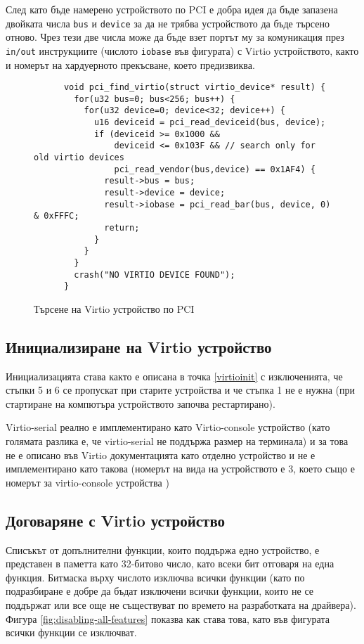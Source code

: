   След като бъде намерено устройството по PCI е добра идея да бъде запазена двойката числа {\tt bus} и {\tt device} за да не трябва устройството да бъде търсено отново. Чрез тези две числа може да бъде взет портът му за комуникация през {\tt in/out} инструкциите (числото {\tt iobase} във фигурата) с Virtio устройството, както и номерът на хардуерното прекъсване, което предизвиква.

  \begin{figure}[htpb]
    \centering
    \begin{verbatim}
      void pci_find_virtio(struct virtio_device* result) {
        for(u32 bus=0; bus<256; bus++) {
          for(u32 device=0; device<32; device++) {
            u16 deviceid = pci_read_deviceid(bus, device);
            if (deviceid >= 0x1000 &&
                deviceid <= 0x103F && // search only for old virtio devices
                pci_read_vendor(bus,device) == 0x1AF4) {
              result->bus = bus;
              result->device = device;
              result->iobase = pci_read_bar(bus, device, 0) & 0xFFFC;
              return;
            }
          }
        }
        crash("NO VIRTIO DEVICE FOUND");
      }
    \end{verbatim}
    \caption{Търсене на Virtio устройство по PCI}
    \label{fig:finding-virtio}
  \end{figure}

  \subsection{Инициализиране на Virtio устройство}
  Инициализацията става както е описана в точка \ref{virtioinit} с изключенията, че стъпки 5 и 6 се пропускат\cite[глава~3.1.2]{virtiodocs} при старите устройства и че стъпка 1 не е нужна (при стартиране на компютъра устройството започва рестартирано).

  Virtio-serial реално е имплементирано като Virtio-console устройство (като голямата разлика е, че virtio-serial не поддържа размер на терминала) и за това не е описано във Virtio документацията като отделно устройство и не е имплементирано като такова (номерът на вида на устройството е $3$, което също е номерът за virtio-console устройства \cite[глава~5.3]{virtiodocs})

  \subsection{Договаряне с Virtio устройство}
  Списъкът от допълнителни функции, които поддържа едно устройство, е представен в паметта като 32-битово число\cite[глава~4.1.4.8]{virtiodocs}, като всеки бит отговаря на една функция. Битмаска върху числото изключва всички функции (като по подразбиране е добре да бъдат изключени всички функции, които не се поддържат или все още не съществуват по времето на разработката на драйвера). Фигура \ref{fig:disabling-all-features} показва как става това, като във фигурата всички функции се изключват.


